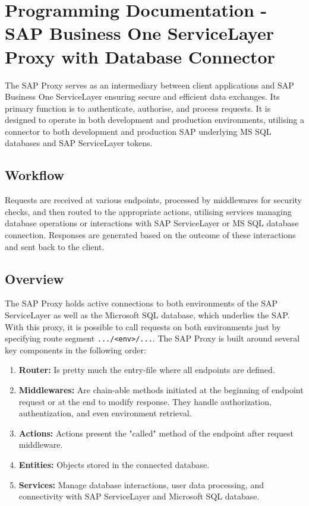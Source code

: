 \chapter{Programming Documentation - SAP Business One ServiceLayer Proxy with Database Connector}
\label{attachments:programming-sap}

The SAP Proxy serves as an intermediary between client applications and SAP Business One ServiceLayer ensuring secure and efficient data exchanges.
Its primary function is to authenticate, authorise, and process requests.
It is designed to operate in both development and production environments, utilising a connector to both development and production SAP underlying MS SQL databases and SAP ServiceLayer tokens. 

\section{Workflow}
Requests are received at various endpoints, processed by middlewares for security checks, and then routed to the appropriate actions, utilising services managing database operations or interactions with SAP ServiceLayer or MS SQL database connection.
Responses are generated based on the outcome of these interactions and sent back to the client.

\section{Overview}
The SAP Proxy holds active connections to both environments of the SAP ServiceLayer as well as the Microsoft SQL database, which underlies the SAP.
With this proxy, it is possible to call requests on both environments just by specifying route segment \texttt{.../<env>/...}.
The SAP Proxy is built around several key components in the following order:
\begin{enumerate}
    \item \textbf{Router:} Is pretty much the entry-file where all endpoints are defined.
    \item \textbf{Middlewares:} Are chain-able methods initiated at the beginning of endpoint request or at the end to modify response. They handle authorization, authentization, and even environment retrieval. 
    \item \textbf{Actions:} Actions present the "called" method of the endpoint after request middleware.
    \item \textbf{Entities:} Objects stored in the connected database.
    \item \textbf{Services:} Manage database interactions, user data processing, and connectivity with SAP ServiceLayer and Microsoft SQL database.
\end{enumerate}

